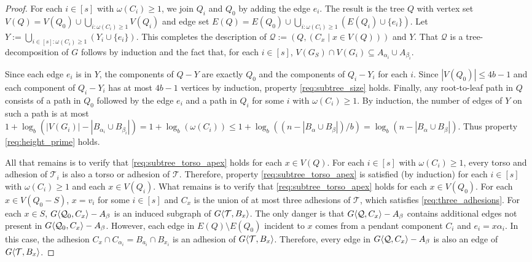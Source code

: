 \begin{proof}
  For each $i\in[s]$ with $\omega(C_i)\ge 1$, we join $Q_i$ and $Q_0$ by adding the edge $e_i$. The result is the tree $Q$ with vertex set $V(Q)=V(Q_0)\cup \bigcup_{i: \omega(C_i)\ge 1} V(Q_i)$ and edge set $E(Q)=E(Q_0)\cup \bigcup_{i: \omega(C_i)\ge 1} (E(Q_i) \cup \{e_i\})$.  Let $Y := \bigcup_{i\in[s]: \omega(C_i)\ge 1} (Y_i \cup \{e_i\})$. This completes the description of $\mathcal{Q}:=(Q,(C_x\mid x\in V(Q)))$ and $Y$. That $\mathcal{Q}$ is a tree-decomposition of $G$ follows by induction and the fact that, for each $i\in[s]$, $V(G_S)\cap V(G_i)\subseteq A_{\alpha_i}\cup A_{\beta_i}$. 
  
  Since each edge $e_i$ is in $Y$, the components of $Q-Y$ are exactly $Q_0$ and the components of $Q_i-Y_i$ for each $i$. Since $|V(Q_0)| \le 4b-1$ and each component of $Q_i-Y_i$ has at most $4b-1$ vertices by induction, property \ref{req:subtree_size} holds. Finally, any root-to-leaf path in $Q$ consists of a path in $Q_0$ followed by the edge $e_i$ and a path in $Q_i$ for some $i$ with $\omega(C_i)\ge 1$. By induction, the number of edges of $Y$ on such a path is at most $1 + \log_b( |V(G_i)| - |B_{\alpha_i} \cup B_{\beta_i}| ) = 1 + \log_b(\omega(C_i)) \le 1 + \log_b((n-|B_\alpha \cup B_\beta|)/b) = \log_b(n-|B_\alpha \cup B_\beta|)$. Thus property \ref{req:height_prime} holds.  

  All that remains is to verify that \ref{req:subtree_torso_apex} holds for each $x\in V(Q)$.  For each $i\in[s]$ with $\omega(C_i)\ge 1$, every torso and adhesion of $\mathcal{T}_i$ is also a torso or adhesion of $\mathcal{T}$. Therefore, property \ref{req:subtree_torso_apex} is satisfied (by induction) for each $i\in[s]$ with $\omega(C_i)\ge 1$ and each $x\in V(Q_i)$.  What remains is to verify that \ref{req:subtree_torso_apex} holds for each $x\in V(Q_0)$. For each $x\in V(Q_0-S)$, $x=v_i$ for some $i\in[s]$ and $C_x$ is the union of at most three adhesions of $\mathcal{T}$, which satisfies \ref{req:three_adhesions}.  For each $x\in S$, ${G}\langle{\mathcal{Q}_0,C_x}\rangle-A_{\beta}$ is an induced subgraph of ${G}\langle{\mathcal{T},B_x}\rangle$.  The only danger is that ${G}\langle{\mathcal{Q},C_x}\rangle-A_\beta$ contains additional edges not present in ${G}\langle{\mathcal{Q}_0,C_x}\rangle-A_{\beta}$.  However, each edge in $E(Q)\setminus E(Q_0)$ incident to $x$ comes from a pendant component $C_i$ and $e_i=x\alpha_i$.  In this case, the adhesion $C_x\cap C_{\alpha_i}=B_{a_i}\cap B_{x_i}$ is an adhesion of ${G}\langle{\mathcal{T},B_x}\rangle$.  Therefore, every edge in ${G}\langle{\mathcal{Q},C_x}\rangle-A_{\beta}$ is also an edge of ${G}\langle{\mathcal{T},B_x}\rangle$.
\end{proof}



